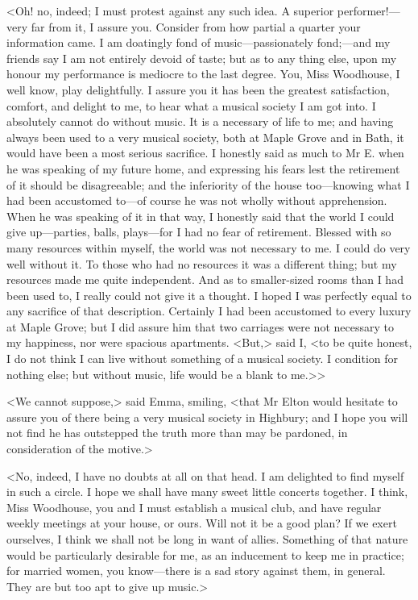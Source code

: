 <Oh! no, indeed; I must protest against any such idea. A superior performer!—very far from it, I assure you. Consider from how partial a quarter your information came. I am doatingly fond of music—passionately fond;—and my friends say I am not entirely devoid of taste; but as to any thing else, upon my honour my performance is mediocre to the last degree. You, Miss Woodhouse, I well know, play delightfully. I assure you it has been the greatest satisfaction, comfort, and delight to me, to hear what a musical society I am got into. I absolutely cannot do without music. It is a necessary of life to me; and having always been used to a very musical society, both at Maple Grove and in Bath, it would have been a most serious sacrifice. I honestly said as much to Mr E. when he was speaking of my future home, and expressing his fears lest the retirement of it should be disagreeable; and the inferiority of the house too—knowing what I had been accustomed to—of course he was not wholly without apprehension. When he was speaking of it in that way, I honestly said that the world I could give up—parties, balls, plays—for I had no fear of retirement. Blessed with so many resources within myself, the world was not necessary to me. I could do very well without it. To those who had no resources it was a different thing; but my resources made me quite independent. And as to smaller-sized rooms than I had been used to, I really could not give it a thought. I hoped I was perfectly equal to any sacrifice of that description. Certainly I had been accustomed to every luxury at Maple Grove; but I did assure him that two carriages were not necessary to my happiness, nor were spacious apartments. <But,> said I, <to be quite honest, I do not think I can live without something of a musical society. I condition for nothing else; but without music, life would be a blank to me.>>

<We cannot suppose,> said Emma, smiling, <that Mr Elton would hesitate to assure you of there being a very musical society in Highbury; and I hope you will not find he has outstepped the truth more than may be pardoned, in consideration of the motive.>

<No, indeed, I have no doubts at all on that head. I am delighted to find myself in such a circle. I hope we shall have many sweet little concerts together. I think, Miss Woodhouse, you and I must establish a musical club, and have regular weekly meetings at your house, or ours. Will not it be a good plan? If we exert ourselves, I think we shall not be long in want of allies. Something of that nature would be particularly desirable for me, as an inducement to keep me in practice; for married women, you know—there is a sad story against them, in general. They are but too apt to give up music.>

